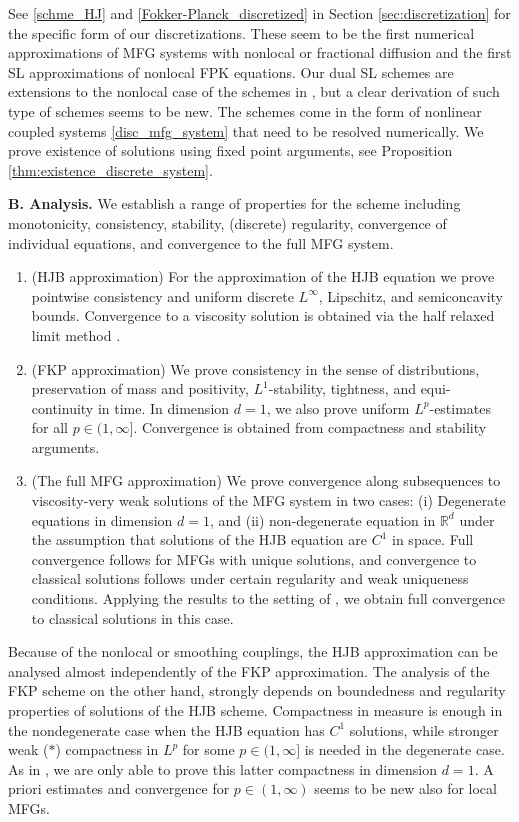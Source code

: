 \documentclass[a4paper,  twoside, 10pt, leqno]{amsart}
\newcommand{\rd}{\mathbb{R}^d}
\theoremstyle{remark}
\theoremstyle{definition}
\begin{document}
See \eqref{schme_HJ} and \eqref{Fokker-Planck_discretized} in Section
\ref{sec:discretization} for the specific form of our
discretizations. These seem to be the first
numerical approximations of MFG systems with nonlocal or fractional
diffusion and the first SL approximations of nonlocal FPK equations. 
Our dual SL schemes are extensions to the nonlocal case of the schemes in
\cite{carliniSilva2014semi1st,carlini2015semi,MR3828859}, but a clear
derivation of such type of schemes seems to be new. The schemes come
in the form of nonlinear coupled systems \eqref{disc_mfg_system} that need to be resolved
numerically. We prove existence of solutions using fixed point
arguments, see Proposition \ref{thm:existence_discrete_system}.
\smallskip

{\bf B. Analysis.} We establish a range of properties for the scheme  including  monotonicity, consistency, stability, (discrete) regularity, convergence of individual equations, and convergence to the full MFG system. 
\begin{enumerate}[ 1.]
\item (HJB approximation) For the approximation of the HJB equation we
  prove pointwise consistency and uniform discrete $L^\infty$,
  Lipschitz, and semiconcavity bounds. Convergence to a viscosity
  solution is obtained via the %
  half relaxed limit method \cite{barles1991convergence}.
\smallskip
\item (FKP approximation) We prove consistency in the sense of
  distributions, preservation of  mass and positivity,  $L^1$-stability, 
  tightness, and equi-continuity in time. In dimension $d=1$, we also
  prove uniform $L^p$-estimates for all $p\in(1,\infty]$. Convergence is obtained from compactness and stability arguments.
\smallskip
\item (The full MFG approximation) We prove convergence along
  subsequences to viscosity-very weak solutions of the MFG system in
  two cases: (i) Degenerate equations in dimension $d=1$, and (ii)
  non-degenerate equation in $\rd$ under the assumption that solutions
  of the HJB equation are $C^1$ in space. Full convergence follows for
  MFGs with unique solutions, and convergence to classical solutions
  follows under certain regularity and weak uniqueness
  conditions. Applying the results to the setting of
  \cite{ersland2020classical}, we obtain full convergence to classical
  solutions in this case.
\end{enumerate}

Because of the nonlocal or smoothing couplings, the HJB approximation can be analysed almost independently of the FKP approximation. The  analysis of the FKP scheme on the other hand, strongly depends on boundedness and regularity properties of solutions of the  HJB scheme. Compactness in measure is enough in the nondegenerate case when the HJB equation has $C^1$ solutions, while stronger weak ($*$) compactness in $L^p$ for some $p\in(1,\infty]$ is needed in the degenerate case. As in \cite{carliniSilva2014semi1st}, we are only able to prove this latter compactness in dimension $d=1$. A priori estimates and convergence for $p\in(1,\infty)$ seems to be new also for local MFGs.
\end{document}
